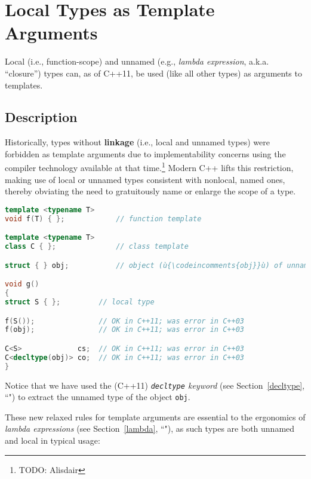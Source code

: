 \newpage
\section[Local Types as Template Arguments]{Local Types as Template Arguments}\label{local-types-as-template-arguments}

Local (i.e., function-scope) and unnamed (e.g., \textit{lambda
expression}, a.k.a. ``closure'') types can, as of C++11, be used (like all other
types) as arguments to templates.

\subsection[Description]{Description}\label{description}

Historically, types without \textbf{linkage} (i.e., local and unnamed
types) were forbidden as template arguments due to implementability
concerns using the compiler technology available at that
time.{\cprotect\footnote{TODO: Alisdair}} Modern C++ lifts this
restriction, making use of local or unnamed types consistent with
nonlocal, named ones, thereby obviating the need to gratuitously name
or enlarge the scope of a type.

\begin{lstlisting}[language=C++]
template <typename T>
void f(T) { };            // function template

template <typename T>
class C { };              // class template

struct { } obj;           // object (ù{\codeincomments{obj}}ù) of unnamed C++ type

void g()
{
struct S { };         // local type

f(S());               // OK in C++11; was error in C++03
f(obj);               // OK in C++11; was error in C++03

C<S>             cs;  // OK in C++11; was error in C++03
C<decltype(obj)> co;  // OK in C++11; was error in C++03
}
\end{lstlisting}

\noindent Notice that we have used the (C++11) {\it \texttt{decltype}
keyword} (see Section~\ref{decltype}, ``") to extract the unnamed type of the object \texttt{obj}.

These new relaxed rules for template arguments are essential to the
ergonomics of {\it lambda expressions} (see Section~\ref{lambda}, ``"), as such types are both
unnamed and local in typical usage:

